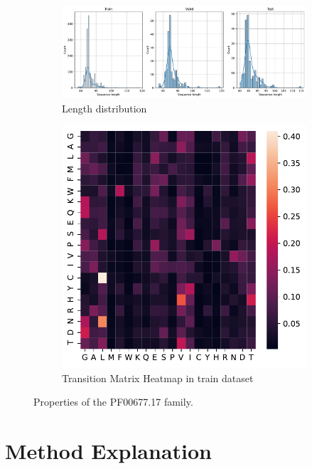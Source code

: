 \documentclass[12pt]{article}
\begin{document}
\begin{figure}[htbp]
    \centering
    \begin{subfigure}{\textwidth}
        \includegraphics[width=\textwidth]{figures/length_seq_00677.pdf}
        \caption{Length distribution}
    \end{subfigure}
    \begin{subfigure}{0.5\textwidth}
        \includegraphics[width=\textwidth]{figures/seq_heatmap_00677.pdf}
        \caption{Transition Matrix Heatmap in train dataset}
    \end{subfigure}
    \caption{Properties of the PF00677.17 family.}
    \label{fig:00677_props}
\end{figure}

\section{Method Explanation}
\end{document}
